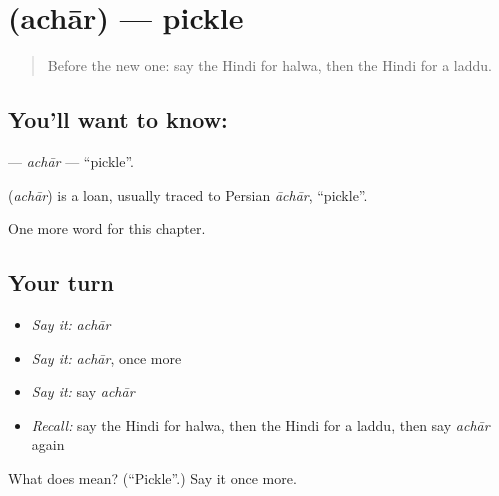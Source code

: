 \section[\texorpdfstring{\hi{अचार} (achār)}{अचार (achār)}]{ (achār) — pickle}

\label{lesson:HI-C210-achar}



\begin{quote}
Before the new one: say the Hindi for halwa, then the Hindi for a laddu.
\end{quote}

\subsection*{You'll want to know: }
\textbf{} — \emph{achār} — \textquotedblleft{}pickle\textquotedblright{}.

\begin{cousinweb}
\textbf{} (\emph{achār}) is a loan, usually traced to Persian \emph{āchār}, \textquotedblleft{}pickle\textquotedblright{}.
\end{cousinweb}

\begin{grammarlens}[title={What you've built}]
One more word for this chapter.
\end{grammarlens}

\subsection*{Your turn}
\begin{itemize}
\raggedright
  \item \emph{Say it:} \emph{achār}
  \item \emph{Say it:} \emph{achār}, once more
  \item \emph{Say it:} say \emph{achār}
  \item \emph{Recall:} say the Hindi for halwa, then the Hindi for a laddu, then say \emph{achār} again
\end{itemize}

\begin{tcolorbox}[breakable,colback=teal!4,colframe=teal!35!black,title={Before you move on}]
What does  mean? (\textquotedblleft{}Pickle\textquotedblright{}.) Say it once more.
\end{tcolorbox}
